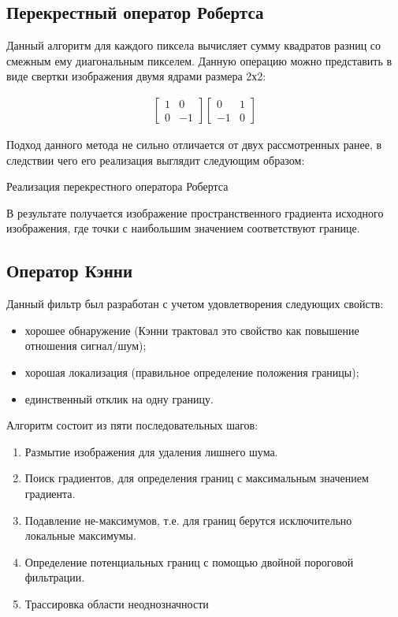 \subsection{Перекрестный оператор Робертса}

Данный алгоритм\cite{Roberts} для каждого пиксела вычисляет сумму квадратов разниц со смежным ему диагональным пикселем. Данную операцию можно представить в виде свертки изображения двумя ядрами размера 2х2:

\begin{eqnarray}\label{eq:roberts-matrixs}
\begin{bmatrix}
1 & 0\\
0 & -1
\end{bmatrix} 
\begin{bmatrix}
0 & 1\\
-1 & 0
\end{bmatrix}
\end{eqnarray}

Подход данного метода не сильно отличается от двух рассмотренных ранее, в следствии чего его реализация выглядит следующим образом:

\begin{minipage}{0.75\textwidth}
	\begin{algorithm}[H]
		
		\caption{Реализация перекрестного оператора Робертса}
		\label{imp:roberts}
	\end{algorithm}
\end{minipage}


В результате получается изображение пространственного градиента исходного изображения, где точки с наибольшим значением соответствуют границе.

\subsection{Оператор Кэнни}

Данный фильтр\cite{Canny} был разработан с учетом удовлетворения следующих свойств:
\begin{itemize}
	\item хорошее обнаружение (Кэнни трактовал это свойство как повышение отношения сигнал/шум);
	\item хорошая локализация (правильное определение положения границы);
	\item единственный отклик на одну границу.
\end{itemize}

Алгоритм состоит из пяти последовательных шагов:
\begin{enumerate}
	\item Размытие изображения для удаления лишнего шума.
	\item Поиск градиентов, для определения границ с максимальным значением градиента.
	\item Подавление не-максимумов, т.е. для границ берутся исключительно локальные максимумы.
	\item Определение потенциальных границ с помощью двойной пороговой фильтрации.
	\item Трассировка области неоднозначности
\end{enumerate}

